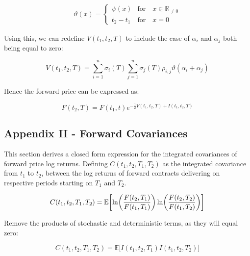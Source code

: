 \documentclass{article}
\begin{document}
\begin{align}
    \vartheta(x) = 
    \begin{cases}
        \psi(x) & \text{for} \quad x \in \mathbb{R}_{\ne 0} \\
        t_2 - t_1 & \text{for} \quad x=0
    \end{cases}
\end{align}

\bigskip

Using this, we can redefine $V(t_1, t_2, T)$ to include the case of $\alpha_i$ and
$\alpha_j$ both being equal to zero:

\begin{equation}
    \nonumber
    V(t_1, t_2, T) = \sum_{i=1}^n \sigma_i(T) \sum_{j=1}^n \sigma_j(T) \rho_{i,j} 
    \vartheta(\alpha_i + \alpha_j)
\end{equation}

Hence the forward price can be expressed as:

\begin{equation}
    F(t_2, T) = F(t_1, t)e^{- \frac{1}{2} V(t_1, t_2, T) + I(t_1, t_2, T)}
\end{equation}



\subsection{Appendix II - Forward Covariances}
This section derives a closed form expression for the integrated covariances of
forward price log returns. Defining $C(t_1, t_2, T_1, T_2)$
as the integrated covariance from $t_1$ to $t_2$, between the log returns of forward 
contracts delivering on respective periods starting on $T_1$ and $T_2$.

\begin{equation}
    C(t_1, t_2, T_1, T_2) = \mathbb{E}\biggl[\ln\biggl(\frac{F(t_2, T_1)}{F(t_1, T_1)} \biggr) 
    \ln\biggl(\frac{F(t_2, T_2)}{F(t_1, T_2)} \biggr) \biggr] \\
\end{equation}

Remove the products of stochastic and deterministic terms, as they will equal zero:

\begin{equation}
    C(t_1, t_2, T_1, T_2) = \mathbb{E}\bigl[ I(t_1, t_2, T_1) I(t_1, t_2, T_2) \bigr] 
\end{equation}
\end{document}
